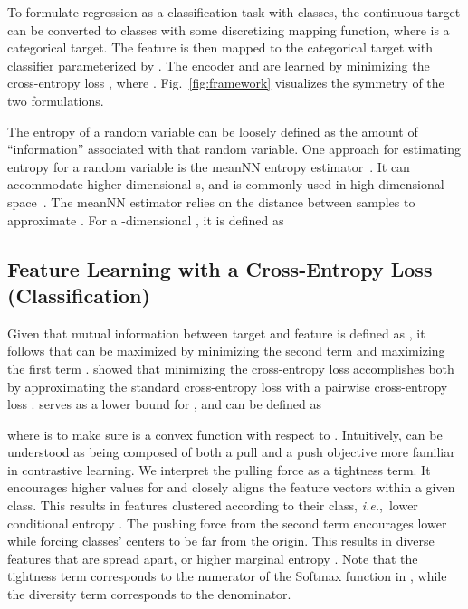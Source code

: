\documentclass{article} \usepackage{iclr2023_conference,times}
\makeatletter
\newcommand*{\ie}{i.e.\@\xspace}
\def\ie{\mbox{\textit{i.e.}, }}
\makeatother
\begin{document}
To formulate regression as a classification task with  classes, the continuous target  can be converted to classes  with some discretizing mapping function, where  is a categorical target. The feature  is then mapped to the categorical target  with classifier  parameterized by .  The encoder  and  are learned by minimizing the cross-entropy loss , where   .
Fig.~\ref{fig:framework} visualizes the symmetry of the two formulations. 

The entropy of a random variable can be loosely defined as the amount of ``information'' associated with that random variable. One approach for estimating entropy  for a random variable  is the meanNN entropy estimator~\citep{faivishevsky2008ica}.  
It can accommodate higher-dimensional s, and is commonly used in high-dimensional space~\citep{faivishevsky2010nonparametric}. 
The meanNN estimator relies on the distance between samples to approximate . For a -dimensional , it is defined as




\subsection{Feature Learning with a Cross-Entropy Loss (Classification)} 

Given that mutual information between target  and feature  is defined as , it follows that  can be maximized by minimizing the second term  and maximizing the first term . \citet{boudiaf2020unifying} showed that minimizing the cross-entropy loss accomplishes both 
by approximating the standard cross-entropy loss  with a pairwise cross-entropy loss .   serves as a lower bound for , and can be defined as 



where 
 is to make sure   is a convex function with respect to .
Intuitively,  can be understood as being composed of both a pull and a push objective more familiar in contrastive learning. We interpret the pulling force as a tightness term.  It encourages higher values for  and closely aligns the feature vectors within a given class. This results in features clustered according to their class, \ie lower conditional entropy .  The pushing force from the second term encourages lower  while forcing classes' centers  to be far from the origin.  This results in diverse features that are spread apart, or higher marginal entropy . Note that the tightness term corresponds to the numerator of the Softmax function in , while the diversity term corresponds to the denominator. 
\end{document}
